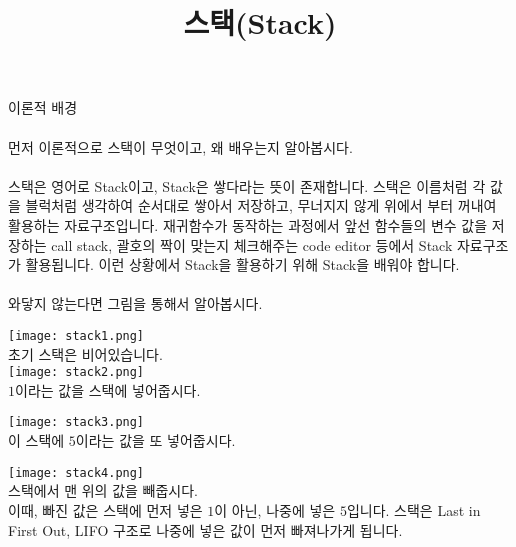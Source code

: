 \documentclass{article}
\title{스택(Stack)}
\begin{document}



\hypersetup{
    colorlinks=true,
    linkcolor=blue,
    filecolor=magenta,      
    urlcolor=cyan,
}

\maketitle

\noindent 이론적 배경\\\\
먼저 이론적으로 스택이 무엇이고, 왜 배우는지 알아봅시다.\\\\
스택은 영어로 Stack이고, Stack은 쌓다라는 뜻이 존재합니다. 스택은 이름처럼 각 값을 블럭처럼 생각하여 순서대로 쌓아서 저장하고, 무너지지 않게 위에서 부터 꺼내여 활용하는 자료구조입니다. 재귀함수가 동작하는 과정에서 앞선 함수들의 변수 값을 저장하는 call stack, 괄호의 짝이 맞는지 체크해주는 code editor 등에서 Stack 자료구조가 활용됩니다. 이런 상황에서 Stack을 활용하기 위해 Stack을 배워야 합니다.\\\\
와닿지 않는다면 그림을 통해서 알아봅시다.

\texttt{[image: stack1.png]}\\
초기 스택은 비어있습니다.\\

\texttt{[image: stack2.png]}\\
$1$이라는 값을 스택에 넣어줍시다.

\texttt{[image: stack3.png]}\\
이 스택에 $5$이라는 값을 또 넣어줍시다.

\texttt{[image: stack4.png]}\\
스택에서 맨 위의 값을 빼줍시다.\\
이때, 빠진 값은 스택에 먼저 넣은 $1$이 아닌, 나중에 넣은 $5$입니다. 스택은 Last in First Out, LIFO 구조로 나중에 넣은 값이 먼저 빠져나가게 됩니다.\\
\end{document}
